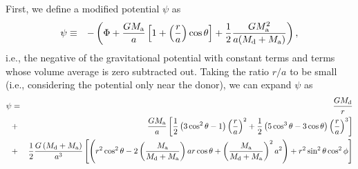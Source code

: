 \documentclass{aastex}
\newcommand{\be}{\begin{eqnarray}}
\newcommand{\ee}{\end{eqnarray}}
\begin{document}
First, we define a modified potential $\psi$ as 
\be
\psi & \equiv & -  \left(  \Phi  +  \frac{GM_{\rm a}}{a} \left[ 1 + \left( \frac{r}{a} \right) \cos \theta \right] + \frac{1}{2} \frac{GM_{\rm a}^2}{a(M_{\rm d}+M_{\rm a})} \right),
\label{eqn:psi_potential}
\ee
i.e., the negative of the gravitational potential with constant terms and terms whose volume average is zero subtracted out. Taking the ratio $r/a$ to be small (i.e., considering the potential only near the donor), we can expand $\psi$ as
\be
\psi & = & \frac{G M_{\rm d}}{r} \nonumber \\ 
& + & \frac{G M_{\rm a}}{a} \left[ \frac{1}{2} \left( 3 \cos^2 \theta - 1 \right) \left( \frac{r}{a} \right)^2 + \frac{1}{2} \left( 5 \cos^3 \theta - 3 \cos \theta \right) \left( \frac{r}{a} \right)^3 \right] \nonumber \\
& + & \frac{1}{2} \frac{G \left( M_{\rm d} + M_{\rm a} \right)}{a^3} \left[ \left( r^2 \cos^2 \theta - 2 \left( \frac{M_{\rm a}}{M_{\rm d} + M_{\rm a}} \right) a r \cos \theta + \left( \frac{M_{\rm a}}{M_{\rm d} + M_{\rm a}} \right)^2 a^2 \right) + r^2 \sin^2 \theta \cos^2 \phi \right]
\label{eqn:psi_initial_expansion}
\ee
\end{document}
